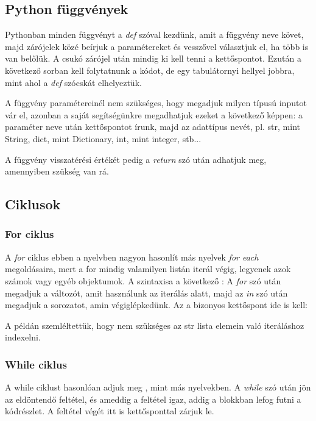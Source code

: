\documentclass{article}
\theoremstyle{definition}
\theoremstyle{theorem}
\begin{document}
\subsection{Python függvények}
Pythonban minden függvényt a \textit{def} szóval kezdünk, amit a függvény neve követ, majd zárójelek közé beírjuk a paramétereket és vesszővel választjuk el, ha több is van belőlük. A csukó zárójel után mindig ki kell tenni a kettőspontot. Ezután a következő sorban kell folytatnunk a kódot, de egy tabulátornyi hellyel jobbra, mint ahol a \textit{def} szócskát elhelyeztük.

A függvény paramétereinél nem szükséges, hogy megadjuk milyen típusú inputot vár el, azonban a saját segítségünkre megadhatjuk ezeket a következő képpen: a paraméter neve után kettőspontot írunk, majd az adattípus nevét, pl. str, mint String, dict, mint Dictionary, int, mint integer, stb...


A függvény visszatérési értékét pedig a \textit{return} szó után adhatjuk meg, amennyiben szükség van rá.
\subsection{Ciklusok}
\subsubsection{For ciklus}
A \textit{for} ciklus ebben a nyelvben nagyon hasonlít más nyelvek \textit{for each} megoldásaira, mert a for mindig valamilyen listán iterál végig, legyenek azok számok vagy egyéb objektumok. A szintaxisa a következő :
A \textit{for} szó után megadjuk a változót, amit használunk az iterálás alatt, majd az \textit{in} szó után megadjuk a sorozatot, amin végiglépkedünk. Az a bizonyos kettőspont ide is kell:



A példán szemléltettük, hogy nem szükséges az str lista elemein való iteráláshoz indexelni.
\subsubsection{While ciklus}
A while ciklust hasonlóan adjuk meg , mint más nyelvekben. A \textit{while} szó után jön az eldöntendő feltétel, és ameddig a feltétel igaz, addig a blokkban lefog futni a kódrészlet. A feltétel végét itt is kettősponttal zárjuk le.

\end{document}
